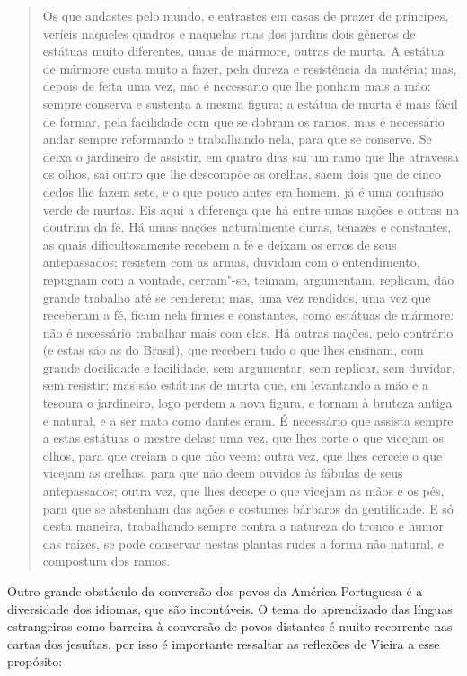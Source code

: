 \begin{quote}
Os que andastes pelo mundo, e entrastes em casas de prazer de
príncipes, veríeis naqueles quadros e naquelas ruas dos jardins dois
gêneros de estátuas muito diferentes, umas de mármore, outras de murta.
A estátua de mármore custa muito a fazer, pela dureza e resistência da
matéria; mas, depois de feita uma vez, não é necessário que lhe ponham
mais a mão: sempre conserva e sustenta a mesma figura; a estátua de
murta é mais fácil de formar, pela facilidade com que se dobram os
ramos, mas é necessário andar sempre reformando e trabalhando nela, para
que se conserve. Se deixa o jardineiro de assistir, em quatro dias sai
um ramo que lhe atravessa os olhos, sai outro que lhe descompõe as
orelhas, saem dois que de cinco dedos lhe fazem sete, e o que pouco
antes era homem, já é uma confusão verde de murtas. Eis aqui a diferença
que há entre umas nações e outras na doutrina da fé. Há umas nações
naturalmente duras, tenazes e constantes, as quais dificultosamente
recebem a fé e deixam os erros de seus antepassados; resistem com as
armas, duvidam com o entendimento, repugnam com a vontade, cerram"-se,
teimam, argumentam, replicam, dão grande trabalho até se renderem; mas,
uma vez rendidos, uma vez que receberam a fé, ficam nela firmes e
constantes, como estátuas de mármore: não é necessário trabalhar mais
com elas. Há outras nações, pelo contrário (e estas são as do Brasil),
que recebem tudo o que lhes ensinam, com grande docilidade e facilidade,
sem argumentar, sem replicar, sem duvidar, sem resistir; mas são
estátuas de murta que, em levantando a mão e a tesoura o jardineiro,
logo perdem a nova figura, e tornam à bruteza antiga e natural, e a ser
mato como dantes eram. É necessário que assista sempre a estas estátuas
o mestre delas: uma vez, que lhes corte o que vicejam os olhos, para que
creiam o que não veem; outra vez, que lhes cerceie o que vicejam as
orelhas, para que não deem ouvidos às fábulas de seus antepassados;
outra vez, que lhes decepe o que vicejam as mãos e os pés, para que se
abstenham das ações e costumes bárbaros da gentilidade. E só desta
maneira, trabalhando sempre contra a natureza do tronco e humor das
raízes, se pode conservar nestas plantas rudes a forma não natural, e
compostura dos ramos.
\end{quote}

Outro grande obstáculo da conversão dos povos da América Portuguesa é a
diversidade dos idiomas, que são incontáveis. O tema do aprendizado das
línguas estrangeiras como barreira à conversão de povos distantes é
muito recorrente nas cartas dos jesuítas, por isso é importante
ressaltar as reflexões de Vieira a esse propósito:

